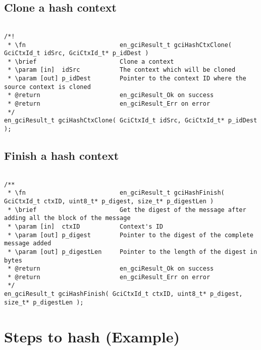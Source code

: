 \subsection{Clone a hash context}
\begin{lstlisting}

/*!
 * \fn 							en_gciResult_t gciHashCtxClone( GciCtxId_t idSrc, GciCtxId_t* p_idDest )
 * \brief						Clone a context
 * \param [in]  idSrc			The context which will be cloned
 * \param [out] p_idDest		Pointer to the context ID where the source context is cloned
 * @return						en_gciResult_Ok on success
 * @return						en_gciResult_Err on error
 */
en_gciResult_t gciHashCtxClone( GciCtxId_t idSrc, GciCtxId_t* p_idDest );

\end{lstlisting}


\subsection{Finish a hash context}
\begin{lstlisting}

/**
 * \fn							en_gciResult_t gciHashFinish( GciCtxId_t ctxID, uint8_t* p_digest, size_t* p_digestLen )
 * \brief						Get the digest of the message after adding all the block of the message
 * \param [in]  ctxID	 		Context's ID
 * \param [out] p_digest		Pointer to the digest of the complete message added
 * \param [out] p_digestLen		Pointer to the length of the digest in bytes
 * @return						en_gciResult_Ok on success
 * @return						en_gciResult_Err on error
 */
en_gciResult_t gciHashFinish( GciCtxId_t ctxID, uint8_t* p_digest, size_t* p_digestLen );

\end{lstlisting}

\newpage

\section{Steps to hash (Example)}

